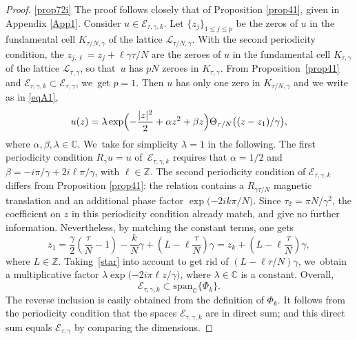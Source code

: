 \documentclass[JEP,XML,SOM,Unicode,NoFloatCountersInSection,published]{cedram}
\theoremstyle{definition}
\let\EE\exp
\newcommand\C{\mathbb C}
\newcommand\Z{\mathbb Z}
\newcommand{\pa}[1]{\left(#1\right)}
\begin{document}
\skpt
\begin{proof}

\eqref{prop72i}
The proof follows closely that of Proposition \ref{prop41}, given in Appendix \ref{App1}. Consider $u\in \mathcal{E}_{\tau,\gamma,k}$. Let $\{z_j\}_{1 \leq j \leq p}$ be the zeros of $u$ in the fundamental cell $K_{{\tau}/{N},\gamma}$ of the lattice $\mathcal{L}_{{\tau}/{N},\gamma}$. With the second periodicity condition, the $z_{j,\ell} = z_j + {\ell \gamma \tau}/{N}$ are the zeroes of $u$ in the fundamental cell $K_{\tau,\gamma}$ of the lattice $\mathcal{L}_{\tau,\gamma}$, so that~$u$ has $pN$ zeroes in $K_{\tau,\gamma}$. From Proposition~\ref{prop41} and $\mathcal{E}_{\tau,\gamma,k} \subset \mathcal{E}_{\tau,\gamma}$, we~get $p=1$. Then $u$ has only one zero in $K_{{\tau}/{N},\gamma}$ and we write as in \eqref{eqA1},
\[
u(z) = \lambda \EE \Bigl({-\frac{|z|^2}{2} + \alpha z^2 + \beta z}\Bigr) \Theta_{{\tau}/{N}}\bigl((z-z_{1})/\gamma\bigr), 
\]
where $\alpha,\beta, \lambda \in \mathbb{C}$. We~take for simplicity $\lambda =1$ in the following. The first periodicity condition $R_\gamma u = u$ of~$\mathcal{E}_{\tau,\gamma,k}$ requires that $\alpha = {1}/{2}$ and $\beta = -{i\pi}/{\gamma} + {2i\ell\pi}/{\gamma}$, with $\ell \in \mathbb{Z}$.
The second periodicity condition of $\mathcal{E}_{\tau,\gamma,k}$ differs from Proposition \ref{prop41}: the relation contains a $R_{{\gamma\tau}/{N}}$ magnetic translation and an additional phase factor $\EE\bigl({-{2ik\pi}/{N}}\bigr)$. Since $\tau_2 = {\pi N}/{\gamma^2}$, the coefficient on $z$ in this periodicity condition already match, and give no further information. Nevertheless, by matching the constant terms, one gets
\[
z_1 = \frac{\gamma}{2}\pa{\frac{\tau}{N}-1} - \frac{k}{N}\gamma + \pa{L-\ell\frac{\tau}{N}}\gamma = z_k + \pa{L-\ell\frac{\tau}{N}}\gamma,
\]
where $L \in \Z$. Taking~\eqref{star} into account to get rid of $ \pa{L-\ell {\tau}/{N}}\gamma$, we~obtain a multiplicative factor $\lambda \EE\bigl({-{2i\pi \ell z}/{\gamma}}\bigr)$, where $\lambda \in \C$ is a constant. Overall,
\[
\mathcal{E}_{\tau,\gamma,k} \subset \text{span}_\C\{\Phi_k\}.
\]
The reverse inclusion is easily obtained from the definition of $\Phi_k$.
It follows from the periodicity condition that the spaces $\mathcal{E}_{\tau,\gamma,k}$ are in direct sum; and this direct sum equals $\mathcal{E}_{\tau,\gamma}$ by comparing the dimensions.


\end{proof}
\end{document}
